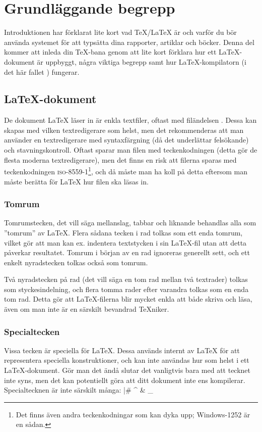 \documentclass[../../latex.tex]{subfiles}
\begin{document}
\section{Grundläggande begrepp}\label{sec:1}
Introduktionen har förklarat lite kort vad \TeX/\LaTeX{} är och varför du
bör använda systemet för att typsätta dina rapporter, artiklar och böcker.
Denna del kommer att inleda din \TeX-bana genom att lite kort förklara hur
ett \LaTeX-dokument är uppbyggt, några viktiga begrepp samt hur
\LaTeX-kompilatorn (i det här fallet ) fungerar.

\subsection{\LaTeX-dokument}
De dokument \LaTeX{} läser in är enkla textfiler, oftast med filändelsen
. Dessa kan skapas med vilken textredigerare som helst,
men det rekommenderas att man använder
en textredigerare med syntaxfärgning (då det underlättar felsökande) och
stavningskontroll. Oftast sparar man filen med teckenkodningen \UTF{} 
(detta gör de flesta moderna textredigerare), men det finns en risk att
filerna sparas med teckenkodningen \textsc{iso-8559-1}\footnote{Det finns 
även andra teckenkodningar som kan dyka upp; Windows-1252 är en sådan.}, 
och då måste man ha koll på detta eftersom man måste berätta för \LaTeX{}
hur filen ska läsas in.

\subsubsection{Tomrum}
Tomrumstecken, det vill säga mellanslag, tabbar och liknande behandlas
alla som ”tomrum” av \LaTeX{}. Flera sådana tecken i rad tolkas som ett
enda tomrum, vilket gör att man kan ex. indentera textstycken i sin
\LaTeX-fil utan att detta påverkar resultatet. Tomrum i början av en rad
ignoreras generellt sett, och ett enkelt nyradstecken tolkas också som
tomrum.

Två nyradstecken på rad (det vill säga en tom rad mellan två textrader) tolkas som
styckesindelning, och flera tomma rader efter varandra tolkas som en enda
tom rad. Detta gör att \LaTeX{}-filerna blir mycket enkla att både skriva
och läsa, även om man inte är en särskilt bevandrad \TeX{}niker.

\subsubsection{Specialtecken}
Vissa tecken är speciella för \LaTeX{}. Dessa används internt av \LaTeX{} 
för att representera speciella konstruktioner, och kan inte användas hur som helst i ett \LaTeX-dokument. Gör man det ändå
slutar det vanligtvis bara med att tecknet inte syns, men det kan
potentiellt göra att ditt dokument inte ens kompilerar. Specialtecknen
är inte särskilt många:
\latex|# ^ & _ { } ~ \ %
\end{document}
